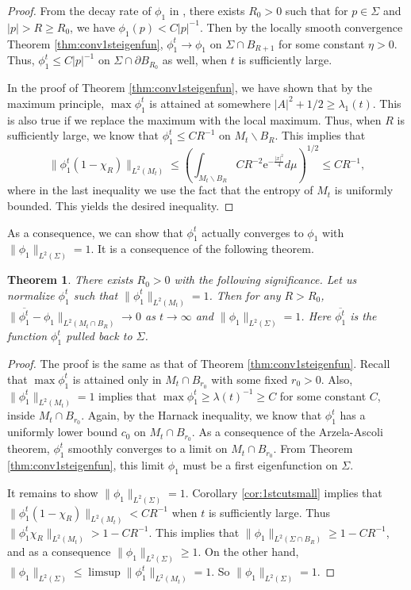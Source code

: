 \documentclass[12pt]{amsart}
\numberwithin{equation}{section}
\newtheorem{theorem}{Theorem}[section]
\numberwithin{equation}{section}
\begin{document}
	\begin{proof}
		From the decay rate of $\phi_1$ in \cite[Proposition 4.1]{BW}, there exists $R_0>0$ such that for $p\in\Sigma$ and $|p|>R\geq R_0$, we have $\phi_1(p)<C|p|^{-1}$. Then by the locally smooth convergence Theorem \ref{thm:conv1steigenfun}, $\phi_1^t\to\phi_1$ on $\Sigma\cap B_{R+1}$ for some constant $\eta>0$. Thus, $\phi_1^t\leq C|p|^{-1}$ on $\Sigma\cap \partial B_{R_0}$ as well, when $t$ is sufficiently large.  
		
		In the proof of Theorem \ref{thm:conv1steigenfun}, we have shown that by the maximum principle, $\max\phi_1^t$ is attained at somewhere $|A|^2+1/2\geq \lambda_1(t)$. This is also true if we replace the maximum with the local maximum. Thus, when $R$ is sufficiently large, we know that $\phi_1^t\leq CR^{-1}$ on $M_t\backslash B_R$. This implies that
		\begin{equation*}
			\|\phi_1^t(1-\chi_R)\|_{L^2(M_t)}\leq\left( \int_{M_t\backslash B_R} CR^{-2}\mathrm{e}^{-\frac{|x|^2}{4}} d\mu\right)^{1/2} \leq CR^{-1},
		\end{equation*}
		where in the last inequality we use the fact that the entropy of $M_t$ is uniformly bounded. This yields the desired inequality.
	\end{proof}
	
	As a consequence, we can show that $\phi_1^t$ actually converges to $\phi_1$ with $\|\phi_1\|_{L^2(\Sigma)}=1$. It is a consequence of the following theorem.
	
	
	\begin{theorem}\label{thm:conv1steigenfunL2}
		There exists $R_0>0$ with the following significance. Let us normalize $\phi_1^t$ such that $\|\phi_1^t\|_{L^2(M_t)}=1$. Then for any $R>R_0$, $\|\overline{\phi_1^t}-\phi_1\|_{L^2(M_t\cap B_R)}\to 0$ as $t\to\infty$ and $\|\phi_1\|_{L^2(\Sigma)}=1$. Here $\overline{\phi_1^t}$ is the function $\phi_1^t$ pulled back to $\Sigma$.
	\end{theorem}
	
	\begin{proof}
		The proof is the same as that of Theorem \ref{thm:conv1steigenfun}. Recall that $\max \phi_1^t$ is attained only in $M_t\cap B_{r_0}$ with some fixed $r_0>0$. Also, $\|\phi_1^t\|_{L^2(M_t)}=1$ implies that $\max\phi_1^t\geq \lambda(t)^{-1}\geq C$ for some constant $C$, inside $M_t\cap B_{r_0}$. Again, by the Harnack inequality, we know that $\phi_1^t$ has a uniformly lower bound $c_0$ on $M_t\cap B_{r_0}$. As a consequence of the Arzela-Ascoli theorem, $\phi_1^t$ smoothly converges to a limit on $M_t\cap B_{r_0}$. From Theorem \ref{thm:conv1steigenfun}, this limit $\phi_1$ must be a first eigenfunction on $\Sigma$. 
		
		It remains to show $\|\phi_1\|_{L^2(\Sigma)}=1$. Corollary \ref{cor:1stcutsmall} implies that $\|\phi_1^t(1-\chi_R)\|_{L^2(M_t)}<CR^{-1}$ when $t$ is sufficiently large. Thus $\|\phi_1^t\chi_R\|_{L^2(M_t)}>1-CR^{-1}$. This implies that $\|\phi_1\|_{L^2(\Sigma\cap B_R)}\geq 1-CR^{-1}$, and as a consequence $\|\phi_1\|_{L^2(\Sigma)}\geq1$. On the other hand, $\|\phi_1\|_{L^2(\Sigma)}\leq \limsup \|\phi_1^t\|_{L^2(M_t)}=1$. So $\|\phi_1\|_{L^2(\Sigma)}=1$.
	\end{proof}
	
\end{document}
